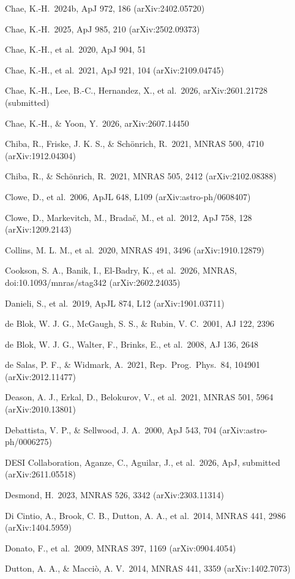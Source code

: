 \documentclass[
  10pt,
]{article}
\begin{document}
{\begin{list}{}{\setlength{\leftmargin}{1.5em}\setlength{\itemindent}{-1.5em}\setlength{\itemsep}{1pt}\setlength{\parsep}{0pt}}
\item Chae, K.-H.\ 2024b, ApJ 972, 186 (arXiv:2402.05720)
\item Chae, K.-H.\ 2025, ApJ 985, 210 (arXiv:2502.09373)
\item Chae, K.-H., et al.\ 2020, ApJ 904, 51
\item Chae, K.-H., et al.\ 2021, ApJ 921, 104 (arXiv:2109.04745)
\item Chae, K.-H., Lee, B.-C., Hernandez, X., et al.\ 2026, arXiv:2601.21728 (submitted)
\item Chae, K.-H., \& Yoon, Y.\ 2026, arXiv:2607.14450
\item Chiba, R., Friske, J. K. S., \& Sch\"onrich, R.\ 2021, MNRAS 500, 4710 (arXiv:1912.04304)
\item Chiba, R., \& Sch\"onrich, R.\ 2021, MNRAS 505, 2412 (arXiv:2102.08388)
\item Clowe, D., et al.\ 2006, ApJL 648, L109 (arXiv:astro-ph/0608407)
\item Clowe, D., Markevitch, M., Brada\v{c}, M., et al.\ 2012, ApJ 758, 128 (arXiv:1209.2143)
\item Collins, M. L. M., et al.\ 2020, MNRAS 491, 3496 (arXiv:1910.12879)
\item Cookson, S. A., Banik, I., El-Badry, K., et al.\ 2026, MNRAS, doi:10.1093/mnras/stag342 (arXiv:2602.24035)
\item Danieli, S., et al.\ 2019, ApJL 874, L12 (arXiv:1901.03711)
\item de Blok, W. J. G., McGaugh, S. S., \& Rubin, V. C.\ 2001, AJ 122, 2396
\item de Blok, W. J. G., Walter, F., Brinks, E., et al.\ 2008, AJ 136, 2648
\item de Salas, P. F., \& Widmark, A.\ 2021, Rep.\ Prog.\ Phys.\ 84, 104901 (arXiv:2012.11477)
\item Deason, A. J., Erkal, D., Belokurov, V., et al.\ 2021, MNRAS 501, 5964 (arXiv:2010.13801)
\item Debattista, V. P., \& Sellwood, J. A.\ 2000, ApJ 543, 704 (arXiv:astro-ph/0006275)
\item DESI Collaboration, Aganze, C., Aguilar, J., et al.\ 2026, ApJ, submitted (arXiv:2611.05518)
\item Desmond, H.\ 2023, MNRAS 526, 3342 (arXiv:2303.11314)
\item Di Cintio, A., Brook, C. B., Dutton, A. A., et al.\ 2014, MNRAS 441, 2986 (arXiv:1404.5959)
\item Donato, F., et al.\ 2009, MNRAS 397, 1169 (arXiv:0904.4054)
\item Dutton, A. A., \& Macci\`o, A. V.\ 2014, MNRAS 441, 3359 (arXiv:1402.7073)

\end{list}}
\end{document}
